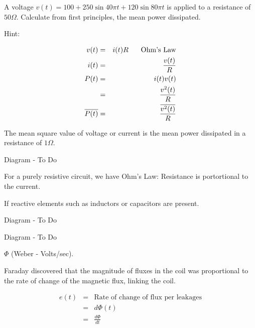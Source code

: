 \documentclass[a4paper,12pt]{article}
\begin{document}
A voltage $v(t) = 100 + 250 \sin{40 \pi t} + 120\sin{80 \pi
t}$ is applied to a resistance of $50 \Omega$. Calculate from first
principles, the mean power dissipated.

Hint:

\begin{eqnarray*}
v(t) & = & i(t) R \mbox{\hspace{5mm} Ohm's Law} \\
i(t) & = & \frac{v(t)}{R} \\
P(t) & = & i(t) v(t) \\
	  & = & \frac{v^{2}(t)}{R} \\
\overline{P(t)} & = & \frac{\overline{v^{2}(t)}}{R}
\end{eqnarray*}

The mean square value of voltage or current is the mean power
dissipated in a resistance of $1 \Omega$.

\begin{table}[hbtp]

Diagram - To Do

\end{table}

For a purely resistive circuit, we have Ohm's Law: Resistance
is portortional to the current.

If reactive elements such as inductors or capacitors are
present.

\begin{table}[hbtp]

Diagram - To Do

\end{table}

\begin{table}[hbtp]

Diagram - To Do

\end{table}

$\Phi$ (Weber - Volts/sec).


Faraday discovered that the magnitude of fluxes in the coil
was proportional to the rate of change of the magnetic flux, linking the
coil.

\begin{eqnarray*}
e(t) & = & \mbox{Rate of change of flux per leakages} \\
	  & = & d \Phi (t) \\
	  & = & \frac{d \Phi}{dt}
\end{eqnarray*}
\end{document}
